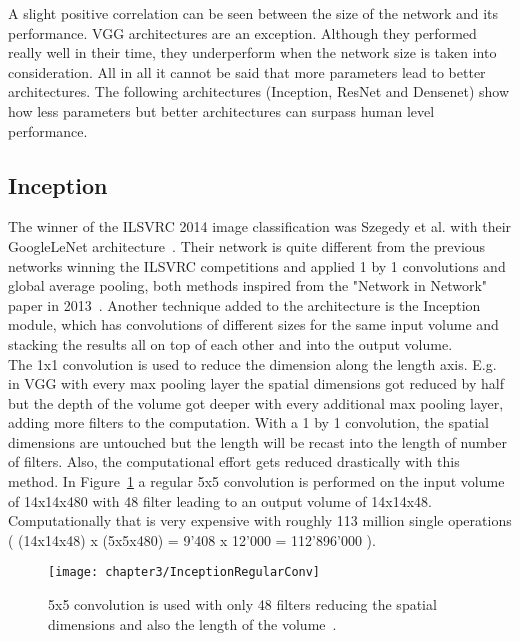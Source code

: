 A slight positive correlation can be seen between the size of the network and its performance. VGG architectures are an exception. Although they performed really well in their time, they underperform when the network size is taken into consideration. All in all it cannot be said that more parameters  lead to better architectures. The following architectures (Inception, ResNet and Densenet) show how less parameters but better architectures can surpass human level performance.\\


\subsection{Inception}

The winner of the ILSVRC 2014 image classification was Szegedy et al. with their GoogleLeNet architecture~\cite{szegedy2015going}. Their network is quite different from the previous networks winning the ILSVRC competitions and applied 1 by 1 convolutions and global average pooling, both methods inspired from the "Network in Network" paper in 2013~\cite{lin2013network}. Another technique added to the architecture is the Inception module, which has convolutions of different sizes for the same input volume and stacking the results all on top of each other and into the output volume. \\

The 1x1 convolution is used to reduce the dimension along the length axis. E.g. in VGG with every max pooling layer the spatial dimensions got reduced by half but the depth of the volume got deeper with every additional max pooling layer, adding more filters to the computation. With a 1 by 1 convolution, the spatial dimensions are untouched but the length will be recast into the length of number of filters. Also, the computational effort gets reduced drastically with this method. In Figure~\ref{fig:InceptionRegularConv} a regular 5x5 convolution is performed on the input volume of 14x14x480 with 48 filter leading to an output volume of 14x14x48. Computationally that is very expensive with roughly 113 million single operations ( (14x14x48) x (5x5x480) = 9'408 x 12'000 = 112'896'000 ).\\


\begin{figure}[!h]
  \centering
  \caption{5x5 convolution is used with only 48 filters reducing the spatial dimensions and also the length of the volume~\cite{ReviewGoogleLeNetv1}.}
  \texttt{[image: chapter3/InceptionRegularConv]}
  \label{fig:InceptionRegularConv}
\end{figure}

